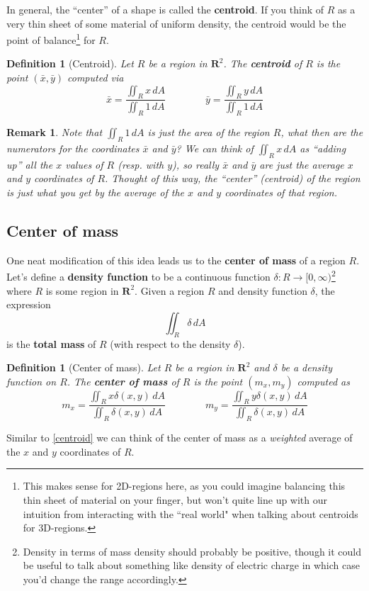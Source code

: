 \documentclass[12pt]{article}
\numberwithin{equation}{subsection}
\numberwithin{figure}{subsection}
\newtheorem{defn}[subsection]{Definition}
\theoremstyle{note}
\newtheorem{remark}[subsection]{Remark}
\begin{document}
{In general, the ``center'' of a shape is called the \textbf{centroid}. If you think of $R$ as a very thin sheet of some material of uniform density, the centroid would be the point of balance\footnote{This makes sense for 2D-regions here, as you could imagine balancing this thin sheet of material on your finger, but won't quite line up with our intuition from interacting with the ``real world" when talking about centroids for 3D-regions.} for $R$. 

\begin{defn}[Centroid]Let $R$ be a region in $\mathbf{R}^2$. The \textbf{centroid} of $R$ is the point $(\bar{x},\bar{y})$ computed via \begin{equation}
	\label{centroid} \bar{x} =\dfrac{\iint_R x\,dA}{\iint_R 1\,dA} \qquad \qquad \bar{y} =\dfrac{\iint_R y\,dA}{\iint_R 1\,dA}
\end{equation} \label{centroid-def-2}
\end{defn}
\begin{remark}Note that $\iint_R 1\,dA$ is just the \textit{area} of the region $R$, what then are the numerators for the coordinates $\bar{x}$ and $\bar{y}$? We can think of $\iint_R x\,dA$ as ``adding up'' all the $x$ values of $R$ (resp. with $y$), so really $\bar{x}$ and $\bar{y}$ are just the \textit{average} $x$ and $y$ coordinates of $R$. Thought of this way, the ``center'' (centroid) of the region is just what you get by the average of the $x$ and $y$ coordinates of that region. \end{remark}

\subsection{Center of mass}
One neat modification of this idea leads us to the \textbf{center of mass} of a region $R$. Let's define a \textbf{density function} to be a continuous function $\delta\colon R\to [0,\infty)$\footnote{Density in terms of mass density should probably be positive, though it could be useful to talk about something like density of electric charge in which case you'd change the range accordingly.} where $R$ is some region in $\mathbf{R}^2$. Given a region $R$ and density function $\delta$, the expression \begin{equation} \iint_R \delta \,dA\end{equation} is the \textbf{total mass} of $R$ (with respect to the density $\delta$).

\begin{defn}[Center of mass]Let $R$ be a region in $\mathbf{R}^2$ and $\delta$ be a density function on $R$. The \textbf{center of mass} of $R$ is the point $(m_x,m_y)$ computed as \begin{equation}
	\label{com} m_x =\dfrac{\displaystyle \iint_R x \delta(x,y) \,dA}{\displaystyle \iint_R \delta(x,y)\,dA} \qquad \qquad m_y =\dfrac{\displaystyle \iint_R y \delta(x,y) \,dA}{\displaystyle \iint_R \delta(x,y)\,dA}
\end{equation}\label{com-def-2}
\end{defn}
Similar to \eqref{centroid} we can think of the center of mass as a \textit{weighted} average of the $x$ and $y$ coordinates of $R$. 

}
\end{document}
